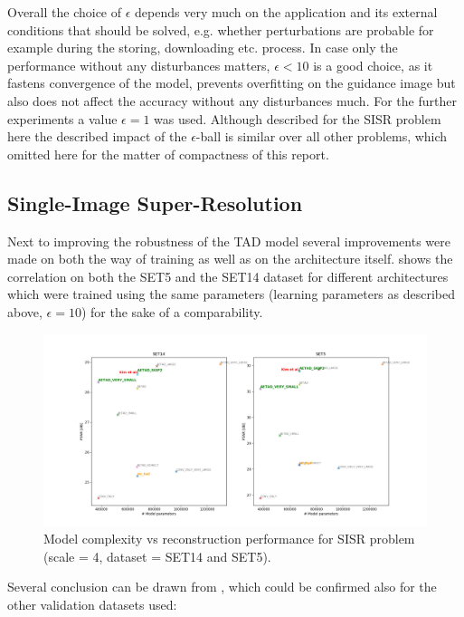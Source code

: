 Overall the choice of $\epsilon$ depends very much on the application and its
external conditions that should be solved, e.g. whether perturbations are
probable for example during the storing, downloading etc. process.
In case only the performance without any disturbances matters, $\epsilon < 10$
is a good choice, as it fastens convergence of the model, prevents overfitting
on the guidance image but also does not affect the accuracy without any
disturbances much. For the further experiments a value $\epsilon = 1$ was used.
\newline
Although described for the \ac{SISR} problem here the described impact of
the $\epsilon$-ball is similar over all other problems, which omitted here
for the matter of compactness of this report.

\subsection{Single-Image Super-Resolution}
\label{sec:Experiments_SISR}
Next to improving the robustness of the \ac{TAD} model several improvements
were made on both the way of training as well as on the architecture itself.
 shows the correlation on both the SET5
and the SET14 dataset for different architectures which were trained using the
same parameters (learning parameters as described above, $\epsilon = 10$) for
the sake of a comparability.

\begin{figure}[!htbp]
	\centering
	\includegraphics[width=18cm]{figures/psnr_complexity_sisr}
	\caption{Model complexity vs reconstruction performance for \ac{SISR}
	problem (scale = 4, dataset = SET14 and SET5).}
  \label{fig:psnr_complexity_sisr}
\end{figure}

Several conclusion can be drawn from , which
could be confirmed also for the other validation datasets used:

